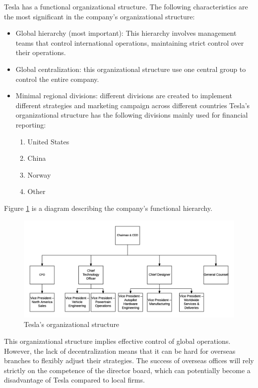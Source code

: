 \documentclass[12pt]{article}
\begin{document}
Tesla has a functional organizational structure. The following characteristics are the most significant in the company's organizational structure:

\begin{itemize}
	\item{Global hierarchy (most important): This hierarchy involves management teams that control international operations, maintaining strict control over their operations.}
	\item{Global centralization: this organizational structure use one central group to control the entire company.}
	\item{Minimal regional divisions: different divisions are created to implement different strategies and marketing campaign across different countries Tesla’s organizational structure has the following divisions mainly used for financial reporting:
	\begin{enumerate}
		\item{United States}
		\item{China}
		\item{Norway}
		\item{Other}
	\end{enumerate}
	}
\end{itemize}

Figure \ref{structpic} is a diagram describing the company's functional hierarchy.

\begin{figure}
	\includegraphics[width=\textwidth]{TeslaStruct.png}
	\caption{Tesla's organizational structure\label{structpic}}
\end{figure}

This organizational structure implies effective control of global operations. However, the lack of decentralization means that it can be hard for overseas branches to flexibly adjust their strategies. The success of overseas offices will rely strictly on the competence of the director board, which can potentially become a disadvantage of Tesla compared to local firms.
\end{document}

